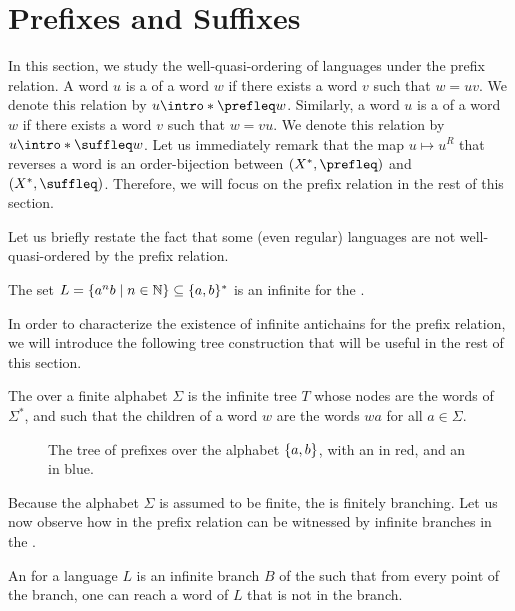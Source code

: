 \section{Prefixes and Suffixes}
\label{prefixes:sec}

In this section, we study the well-quasi-ordering of languages under the prefix
relation. A word $u$ is a  of a word $w$ if there exists a word
$v$ such that $w = uv$. We denote this relation by $u \intro*\prefleq w$.
Similarly, a word $u$ is a  of a word $w$ if there exists a word
$v$ such that $w = vu$. We denote this relation by $u \intro*\suffleq w$. Let
us immediately remark that the map $u \mapsto u^R$ that reverses a word is an
order-bijection between $(X^*, \prefleq)$ and $(X^*, \suffleq)$. Therefore, we
will focus on the prefix relation in the rest of this section.


Let us briefly restate the fact that some (even regular) languages 
are not well-quasi-ordered by the prefix relation.

\begin{example}
    The set $L = \{ a^nb \mid n \in \mathbb{N} \} \subseteq \{ a,b \}^*$ is an infinite  for the
    .
\end{example}

In order to characterize the existence of infinite antichains for the prefix
relation, we will introduce the following tree construction that
will be useful in the rest of this section.

\begin{definition}
    The  over a finite alphabet $\Sigma$
    is the infinite tree $T$ whose nodes are the words of $\Sigma^*$, and
    such that the children of a word $w$ are the words $wa$ for all $a \in
    \Sigma$. 
\end{definition}

\begin{figure}
    \centering
    \caption{The tree of prefixes over the alphabet $\{ a,b \}$,
        with an  in red, and
        an  in blue.}
\end{figure}

Because the alphabet $\Sigma$ is assumed to be finite, the  is finitely branching. Let us now observe how  in the
prefix relation can be witnessed by infinite branches in the .

\begin{definition}
    An  for a language $L$ is an infinite 
    branch $B$ of the  such that from every point of the branch, 
    one can reach a word of $L$ that is not in the branch.
\end{definition}

